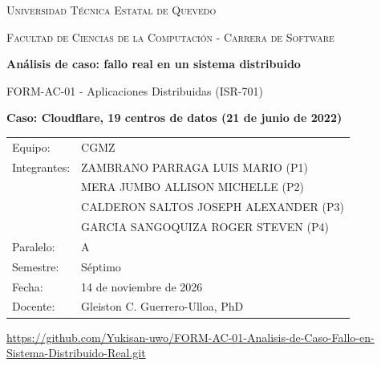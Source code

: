 \documentclass[10pt,a4paper]{article}
\begin{document}
\begin{titlepage}
\centering
{\scshape\large Universidad Técnica Estatal de Quevedo\par}
{\scshape Facultad de Ciencias de la Computación - Carrera de Software\par}
\vspace{1.2cm}
{\Large\bfseries Análisis de caso: fallo real en un sistema distribuido\par}
\vspace{0.3cm}
{\large FORM-AC-01 - Aplicaciones Distribuidas (ISR-701)\par}
\vspace{1.4cm}
{\large\bfseries Caso: Cloudflare, 19 centros de datos (21 de junio de 2022)\par}
\vspace{1.4cm}
\begin{tabular}{@{}ll@{}}
Equipo:      & CGMZ \\
Integrantes: & ZAMBRANO PARRAGA LUIS MARIO (P1) \\
             & MERA JUMBO ALLISON MICHELLE (P2) \\
             & CALDERON SALTOS JOSEPH ALEXANDER (P3) \\
             & GARCIA SANGOQUIZA ROGER STEVEN (P4) \\
Paralelo:    & A \\
Semestre:    & Séptimo \\
Fecha:       & 14 de noviembre de 2026 \\
Docente:     & Gleiston C. Guerrero-Ulloa, PhD \\
\end{tabular}
\vfill
{\footnotesize\url{https://github.com/Yukisan-uwo/FORM-AC-01-Analisis-de-Caso-Fallo-en-Sistema-Distribuido-Real.git}\par}
\end{titlepage}
\setcounter{page}{2}

\end{document}
